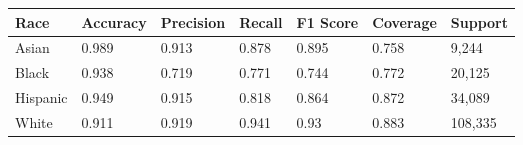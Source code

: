 \begin{tabular}{lllllll}
\toprule
Race & Accuracy & Precision & Recall & F1 Score & Coverage & Support \\
\midrule
Asian & 0.989 & 0.913 & 0.878 & 0.895 & 0.758 & 9,244 \\
Black & 0.938 & 0.719 & 0.771 & 0.744 & 0.772 & 20,125 \\
Hispanic & 0.949 & 0.915 & 0.818 & 0.864 & 0.872 & 34,089 \\
White & 0.911 & 0.919 & 0.941 & 0.93 & 0.883 & 108,335 \\
\bottomrule
\end{tabular}
